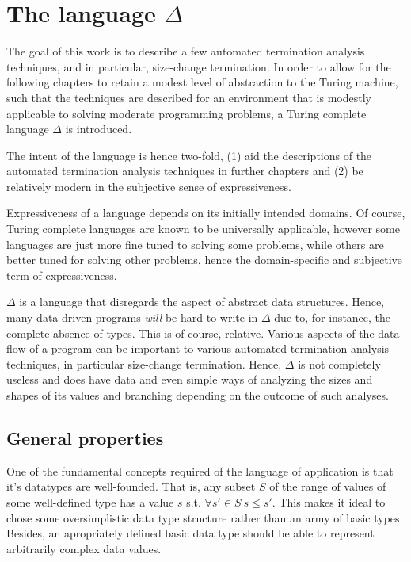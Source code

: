 \newcommand{\D}{$\Delta$}
\chapter{The language \D{}}

The goal of this work is to describe a few automated termination analysis
techniques, and in particular, size-change termination. In order to allow for
the following chapters to retain a modest level of abstraction to the Turing
machine, such that the techniques are described for an environment that is
modestly applicable to solving moderate programming problems, a Turing complete
language \D{} is introduced.

The intent of the language is hence two-fold, (1) aid the descriptions of the
automated termination analysis techniques in further chapters and (2) be
relatively modern in the subjective sense of expressiveness.

Expressiveness of a language depends on its initially intended domains. Of
course, Turing complete languages are known to be universally applicable,
however some languages are just more fine tuned to solving some problems, while
others are better tuned for solving other problems, hence the domain-specific
and subjective term of expressiveness.

\D{} is a language that disregards the aspect of abstract data structures.
Hence, many data driven programs \emph{will} be hard to write in \D{} due to,
for instance, the complete absence of types. This is of course, relative.
Various aspects of the data flow of a program can be important to various
automated termination analysis techniques, in particular size-change
termination. Hence, \D{} is not completely useless and does have data and even
simple ways of analyzing the sizes and shapes of its values and branching
depending on the outcome of such analyses.

\section{General properties}

One of the fundamental concepts required of the
language of application is that it's datatypes are well-founded. That is, any
subset $S$ of the range of values of some well-defined type has a value $s$
s.t. $\forall {s'\in S}\ s\leq s'$. This makes it ideal to chose some
oversimplistic data type structure rather than an army of basic types. Besides,
an apropriately defined basic data type should be able to represent arbitrarily
complex data values.

